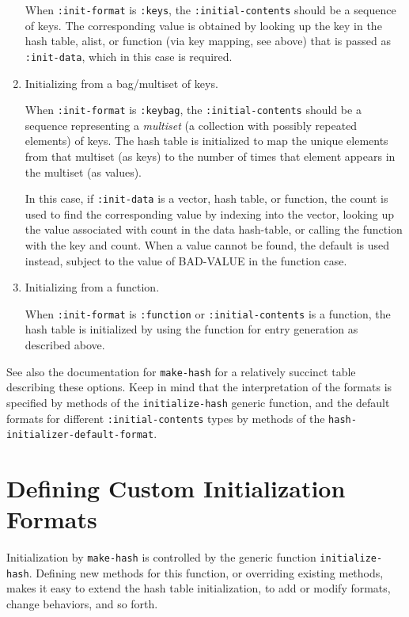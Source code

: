 \documentclass[11pt]{article}
\begin{document}
\begin{enumerate}
      When \texttt{:init-format} is \texttt{:keys}, the \texttt{:initial-contents} should be a
      sequence of keys. The corresponding value is obtained by looking
      up the key in the hash table, alist, or function (via key mapping,
      see above) that is passed as \texttt{:init-data}, which in this case
      is required.
\item Initializing from a bag/multiset of keys.
      
      When \texttt{:init-format} is \texttt{:keybag}, the \texttt{:initial-contents} should be a
      sequence representing a \emph{multiset} (a collection with possibly
      repeated elements) of keys. The hash table is initialized to map the
      unique elements from that multiset (as keys) to the number of times
      that element appears in the multiset (as values).
      
      In this case, if \texttt{:init-data} is a vector, hash table, or function,
      the count is used to find the corresponding value by indexing into the
      vector, looking up the value associated with count in the data
      hash-table, or calling the function with the key and count. When a
      value cannot be found, the default is used instead, subject to the
      value of BAD-VALUE in the function case.
\item Initializing from a function.
      
      When \texttt{:init-format} is \texttt{:function} or \texttt{:initial-contents} is a function,
      the hash table is initialized by using the function for entry generation
      as described above.
\end{enumerate}

\noindent
   See also the documentation for \texttt{make-hash} for a relatively succinct
   table describing these options. Keep in mind that the interpretation of
   the formats is specified by methods of the \texttt{initialize-hash} generic
   function, and the default formats for different \texttt{:initial-contents} types
   by methods of the \texttt{hash-initializer-default-format}.
  
\section{Defining Custom Initialization Formats}
\label{sec-5}


  Initialization by \texttt{make-hash} is controlled by the generic function
  \texttt{initialize-hash}. Defining new methods for this function, or overriding
  existing methods, makes it easy to extend the hash table initialization,
  to add or modify formats, change behaviors, and so forth.
\end{document}
